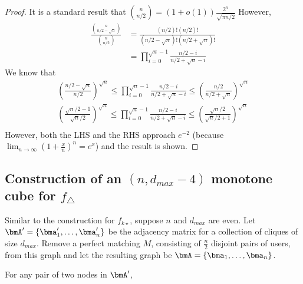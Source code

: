 \begin{proof}
It is a standard result that $\binom{n}{n/2} = (1+o(1)) \frac{2^{n}}{\sqrt{\pi n/2}}$
However,
\begin{align*}
    \frac{\binom{n}{n/2-\sqrt{n}}}{\binom{n}{n/2}} &= \frac{(n/2)!(n/2)!}{(n/2-\sqrt{n})!(n/2+\sqrt{n})!} \\
    &= \prod_{i=0}^{\sqrt{n}-1} \frac{n/2-i}{n/2+\sqrt{n}-i}
\end{align*}
We know that
\begin{align*}
    \left(\frac{n/2-\sqrt{n}}{n/2}\right)^{\sqrt{n}} \leq \prod_{i=0}^{\sqrt{n}-1} \frac{n/2-i}{n/2+\sqrt{n}-i} \leq \left(\frac{n/2}{n/2+\sqrt{n}} \right)^{\sqrt{n}} \\
    \left(\frac{\sqrt{n}/2-1}{\sqrt{n}/2}\right)^{\sqrt{n}} \leq \prod_{i=0}^{\sqrt{n}-1} \frac{n/2-i}{n/2+\sqrt{n}-i} \leq \left(\frac{\sqrt{n}/2}{\sqrt{n}/2+1} \right)^{\sqrt{n}} \\
\end{align*}
However, both the LHS and the RHS approach $e^{-2}$ (because $\lim_{n \rightarrow \infty} (1+\frac{x}{n})^n = e^x$) and the result is shown.
\end{proof}


\subsection{Construction of an $(n, d_{max}-4)$ monotone cube for $f_\triangle$}
\label{chap1-sub:cube_triangle}
Similar to the construction for $f_{k\star}$, suppose $n$ and $d_{max}$ are
even. Let $\bmA' = \{\bma_1', \ldots, \bma_n'\}$ be the adjacency matrix for a 
collection of cliques of size 
$d_{max}$. 
Remove a perfect matching $M$, consisting of $\frac{n}{2}$
disjoint pairs of users, from this graph and let the
resulting graph be $\bmA = \{\bma_1, \ldots, \bma_n\}$. 

For any pair of two nodes in $\bmA'$, 


